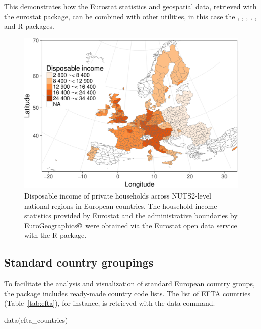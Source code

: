 This demonstrates how the Eurostat statistics and geospatial data, retrieved with the eurostat package, can be combined with other utilities, in this case the  \citep{grid},  \citep{maptools},  \citep{rgdal},  \citep{rgeos},  \citep{scales}, and  \citep{stringr} R packages.


\begin{figure}
\begin{center}
\includegraphics{2017-manu-mapexample-1}
\caption{Disposable income of private households across NUTS2-level national regions in European countries. The household income statistics provided by Eurostat and the administrative boundaries by EuroGeographics\copyright \  were obtained via the Eurostat open data service with the  R package.}
\label{fig:mapexample}
\end{center}
\end{figure}


\subsection{Standard country groupings}

To facilitate the analysis and visualization of standard European
country groups, the  package includes ready-made
country code lists. The list of EFTA countries (Table~\ref{tab:efta}),
for instance, is retrieved with the data command.

\begin{example}
  data(efta_countries)
\end{example}

